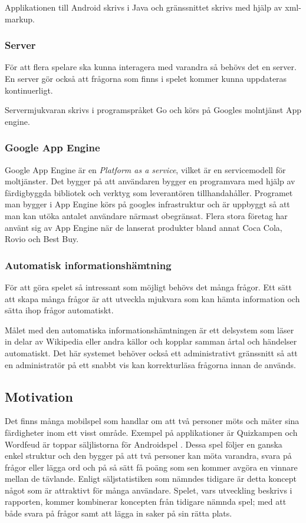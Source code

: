 \documentclass[12pt,a4paper]{article}
\begin{document}
Applikationen till Android skrivs i Java och gränssnittet skrivs med hjälp av xml-markup.

\subsubsection{Server}
För att flera spelare ska kunna interagera med varandra så behövs det en server. En server gör också att frågorna som finns i spelet kommer kunna uppdateras kontinuerligt.

Servermjukvaran skrivs i programspråket Go \cite{golang} och körs på Googles molntjänst App engine.

\subsubsection{Google App Engine} 
Google App Engine är en \textit{Platform as a service}, vilket är en servicemodell för moltjänster. Det bygger på att användaren bygger en programvara med hjälp av färdigbyggda bibliotek och verktyg som leverantören tillhandahåller. Programet man bygger i App Engine körs på googles infrastruktur och är uppbyggt så att man kan utöka antalet användare närmast obegränsat. Flera stora företag har använt sig av App Engine när de lanserat produkter bland annat Coca Cola, Rovio och Best Buy. \cite{googleappenginecustomers}

\subsubsection{Automatisk informationshämtning}
För att göra spelet så intressant som möjligt behövs det många frågor. Ett sätt att skapa många frågor är att utveckla mjukvara som kan hämta information och sätta ihop frågor automatiskt. 

Målet med den automatiska informationshämtningen är ett delsystem som läser in delar av Wikipedia eller andra källor och kopplar samman årtal och händelser automatiskt. Det här systemet behöver också ett administrativt gränssnitt så att en administratör på ett snabbt vis kan korrekturläsa frågorna innan de används.

\subsection{Motivation}
Det finns många mobilspel som handlar om att två personer möts och mäter sina färdigheter inom ett visst område. Exempel på applikationer är Quizkampen och Wordfeud är toppar säljlistorna för Androidspel \cite{appsalesrating}. Dessa spel följer en ganska enkel struktur och den bygger på att två personer kan möta varandra, svara på frågor eller lägga ord och på så sätt få poäng som sen kommer avgöra en vinnare mellan de tävlande. Enligt säljstatistiken som nämndes tidigare är detta koncept något som är attraktivt för många användare. Spelet, vars utveckling beskrivs i rapporten, kommer kombinerar koncepten från tidigare nämnda spel; med att både svara på frågor samt att lägga in saker på sin rätta plats. 
\end{document}
